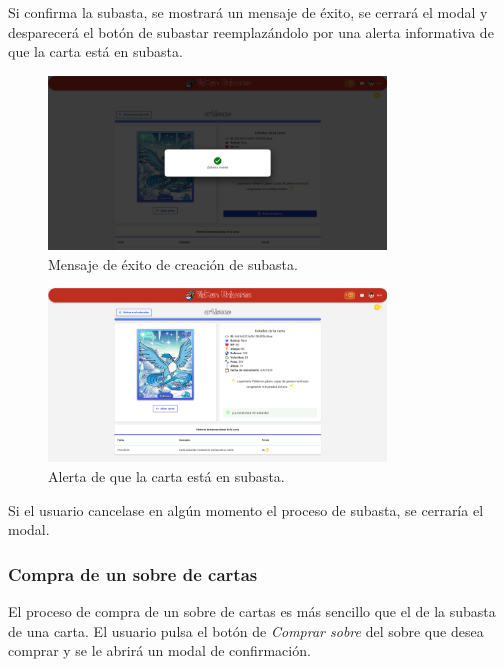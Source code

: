 Si confirma la subasta, se mostrará un mensaje de éxito, se cerrará el modal y desparecerá el botón de subastar reemplazándolo por una
alerta informativa de que la carta está en subasta.

\begin{figure}[H]
    \centering
    \includegraphics[width=0.8\textwidth]{figures/6-Analisis/6-Interfaz/interfaz/subasta_creada.png}
    \caption{Mensaje de éxito de creación de subasta.}
    \label{fig:interfaz-subasta-exito}
\end{figure}

\begin{figure}[H]
    \centering
    \includegraphics[width=0.8\textwidth]{figures/6-Analisis/6-Interfaz/interfaz/subasta_creada2.png}
    \caption{Alerta de que la carta está en subasta.}
    \label{fig:interfaz-subasta-alerta}
\end{figure}

Si el usuario cancelase en algún momento el proceso de subasta, se cerraría el modal.


\subsubsection{Compra de un sobre de cartas}
El proceso de compra de un sobre de cartas es más sencillo que el de la subasta de una carta.
El usuario pulsa el botón de \textit{Comprar sobre} del sobre que desea comprar y se le abrirá un modal de confirmación.

